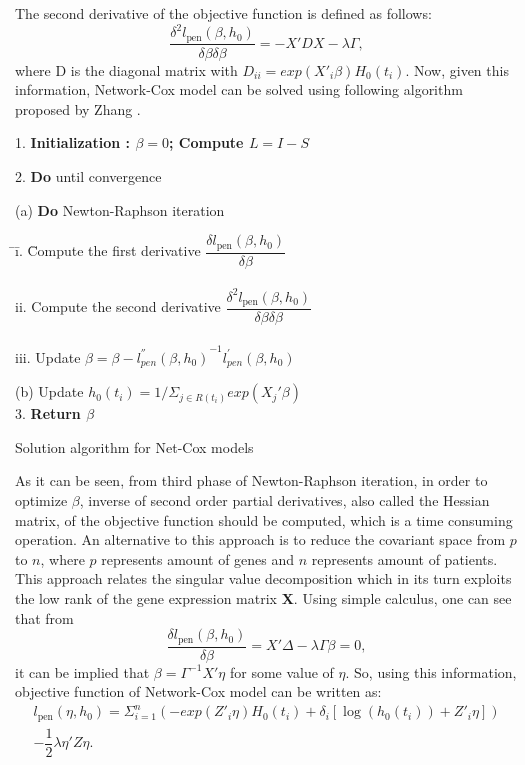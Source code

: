 \documentclass{ba-kecs}
\numberwithin{figure}{section}
\numberwithin{equation}{section}
\begin{document}
The second derivative of the objective function is defined as follows:
\begin{equation}
\dfrac{\delta^2{l_\mathrm{pen}(\beta , h_{0})}}{\delta{\beta}\delta{\beta}} = -X'DX - \lambda{\Gamma} ,
\end{equation}
where D is the diagonal matrix with $D_{ii} = exp(X'_{i}\beta)H_{0}(t_{i})$. Now, given this information, Network-Cox model can be solved using following algorithm proposed by Zhang \cite{netcox}.


\begin{algorithm}


1. \textbf{Initialization : $\beta = 0$; Compute $L = I - S$}

2. \textbf{Do} until convergence

(a) \textbf{Do} Newton-Raphson iteration

\begin{tabbing}
\= 	\quad \= i. \= Compute the first derivative $\dfrac{\delta{l_\mathrm{pen}(\beta , h_{0})}}{\delta{\beta}}$ \\ \\
\> 		\> ii. \> Compute the second derivative $\dfrac{\delta^2{l_\mathrm{pen}(\beta , h_{0})}}{\delta{\beta}\delta{\beta}} $\\ \\
\> 		\> iii. \> Update $\beta = \beta - {l^{''}_{pen}(\beta,h_{0})}^{-1}l^{'}_{pen}(\beta,h_0)$
\end{tabbing}

(b) Update $h_{0}(t_{i}) = 1/\Sigma_{j \in R(t_{i})} exp(X_{j}'\beta)$
\\
3. \textbf{Return $\beta$}

\caption{Solution algorithm for Net-Cox models}
\end{algorithm}


As it can be seen, from third phase of Newton-Raphson iteration, in order to optimize $\beta$, inverse of second order partial derivatives, also called the Hessian matrix, of the objective function should be computed, which is a time consuming operation. An alternative to this approach is to reduce the covariant space from $p$ to $n$, where $p$ represents amount of genes and $n$ represents amount of patients. This approach relates the singular value decomposition which in its turn exploits the low rank of the gene expression matrix \textbf{X}. Using simple calculus, one can see that from
\begin{equation}
\dfrac{\delta{l_\mathrm{pen}(\beta , h_{0})}}{\delta{\beta}} = X'\Delta - \lambda{\Gamma}\beta = 0,
\end{equation}
it can be implied that $\beta = \Gamma^{-1} X' \eta$ for some value of $\eta$. So, using this information, objective function of Network-Cox model can be written as:
\begin{multline}
l_\mathrm{pen}(\eta , h_{0}) = \Sigma^{n}_{i=1}(-exp(Z'_{i}\eta)H_{0}(t_{i})+\delta_{i}[\log(h_{0}(t_{i}))+Z'_{i}\eta]) \\
 - \dfrac{1}{2}\lambda{\eta'}Z\eta.
\end{multline}
\end{document}
